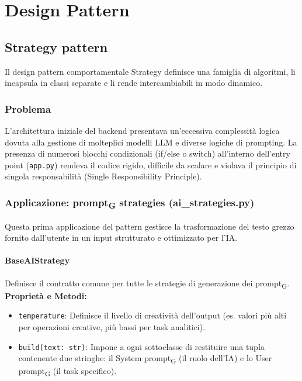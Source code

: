 \documentclass[11pt,a4paper]{article}
\newcommand{\gls}[1]{#1\textsubscript{G}}
\begin{document}
\newpage

\section{Design Pattern}
\subsection{Strategy pattern}
Il design pattern comportamentale Strategy definisce una famiglia di algoritmi, li incapsula in classi separate e li rende intercambiabili in modo dinamico.

\subsubsection{Problema}
L’architettura iniziale del backend presentava un'eccessiva complessità logica dovuta alla gestione di molteplici modelli LLM e diverse logiche di prompting. La presenza di numerosi blocchi condizionali (if/else o switch) all'interno dell'entry point (\texttt{app.py}) rendeva il codice rigido, difficile da scalare e violava il principio di singola responsabilità (Single Responsibility Principle).


\subsubsection{Applicazione: \gls{prompt} strategies (ai\_strategies.py)}
Questa prima applicazione del pattern gestisce la trasformazione del testo grezzo fornito dall'utente in un input strutturato e ottimizzato per l'IA.

\paragraph{BaseAIStrategy}
Definisce il contratto comune per tutte le strategie di generazione dei \gls{prompt}.
\textbf{Proprietà e Metodi:}
\begin{itemize}
    \item \texttt{temperature}: Definisce il livello di creatività dell'output (es. valori più alti per operazioni creative, più bassi per task analitici).
    \item \texttt{build(text: str)}: Impone a ogni sottoclasse di restituire una tupla contenente due stringhe: il \gls{System prompt} (il ruolo dell'IA) e lo \gls{User prompt} (il task specifico).
\end{itemize}
\end{document}
